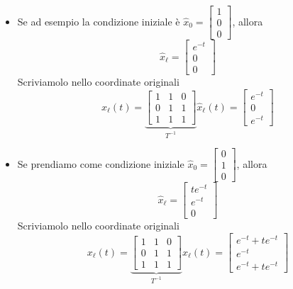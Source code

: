 \documentclass{article}
\begin{document}
\begin{itemize}
\item Se ad esempio la condizione iniziale è $\hat x_0 = \begin{bmatrix} 1\\0\\0 \end{bmatrix}$, allora
\[
    \hat x_\ell = \begin{bmatrix} e^{-t}\\0\\0 \end{bmatrix}
\]
Scriviamolo nello coordinate originali
\[
    x_\ell(t) = \underbrace{\begin{bmatrix}
        1&1&0\\
        0&1&1\\
        1&1&1
    \end{bmatrix}}_{T^{-1}} \hat x_\ell (t) = 
    \begin{bmatrix}
        e^{-t}\\
        0\\
        e^{-t}
    \end{bmatrix}
\]
\item Se prendiamo come condizione iniziale $\hat x_0 = \begin{bmatrix} 0\\1\\0 \end{bmatrix}$, allora
\[
    \hat x_\ell = \begin{bmatrix} te^{-t}\\e^{-t}\\0 \end{bmatrix}
\]
Scriviamolo nello coordinate originali
\[
    x_\ell(t) = \underbrace{\begin{bmatrix}
        1&1&0\\
        0&1&1\\
        1&1&1
    \end{bmatrix} }_{T^{-1}} \hat x_\ell (t) = 
    \begin{bmatrix}
        e^{-t} + te^{-t}\\
        e^{-t}\\
        e^{-t} + te^{-t}
    \end{bmatrix}
\]



\end{itemize}
\end{document}
